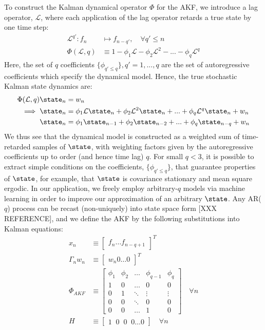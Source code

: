 To construct the Kalman dynamical operator $\Phi$ for the AKF, we introduce a lag operator, $\mathcal{L}$, where each application of the lag operator retards a true state by one time step:
\begin{align}
\mathcal{L}^{q'}: f_n &\mapsto f_{n-q'}, \quad \forall q' \leq n \\
\Phi(\mathcal{L},q) & \equiv  1 - \phi_1 \mathcal{L} - \phi_2 \mathcal{L}^2 - ... - \phi_q \mathcal{L}^q 
\end{align}
Here, the set of $q$ coefficients $\{\phi_{q' \leq q}\}, q' = 1, ... , q $ are the set of autoregressive coefficients which specify the dynamical model. Hence, the true stochastic Kalman state dynamics are:
\begin{align}
\Phi(\mathcal{L},q) \state_n & = w_n \\ 
\implies \state_n & = \phi_1 \mathcal{L} \state_n + \phi_2 \mathcal{L}^2 \state_n + ... + \phi_q \mathcal{L}^q \state_n + w_n \\
 \state_n &= \phi_1 \state_{n-1} + \phi_2 \state_{n-2} + ... + \phi_q \state_{n-q} + w_n \label{eqn:main:ARprocess}
\end{align}
We thus see that the dynamical model is constructed as a weighted sum of time-retarded samples of $\state$, with weighting factors given by the autoregressive coefficients up to order (and hence time lag) $q$.  %
For small $q < 3$, it is possible to extract simple conditions on the coefficients, $\{ \phi_{q' \leq q} \}$, that guarantee properties of $\state$, for example, that $\state$ is covariance stationary and mean square ergodic. In our application, we freely employ arbitrary-$q$ models via machine learning in order to improve our approximation of an arbitrary $\state$. Any AR($q$) process can be recast (non-uniquely) into state space form [XXX REFERENCE], and we define the AKF by the following substitutions into Kalman equations:
\begin{align}
x_n & \equiv  \begin{bmatrix} f_{n} \hdots f_{n-q+1} \end{bmatrix}^T \\
\Gamma_n w_n & \equiv \begin{bmatrix} w_{n} 0 \hdots 0 \end{bmatrix}^T \\
\Phi_{AKF} & \equiv 
\begin{bmatrix}
\phi_1 & \phi_2 & \hdots & \phi_{q-1} & \phi_q \\ 
1 & 0 & \hdots & 0 & 0 \\  
0 & 1 & \ddots & \vdots & \vdots \\ 
0 & 0 & \ddots & 0 & 0 \\ 
0 & 0 & \hdots & 1 & 0 
\end{bmatrix} \quad \forall n \label{eqn:akf_Phi} \\
H & \equiv \begin{bmatrix} 1\;\;0\;\;0\;\;0\hdots0 \end{bmatrix} \quad \forall n  
\end{align}
